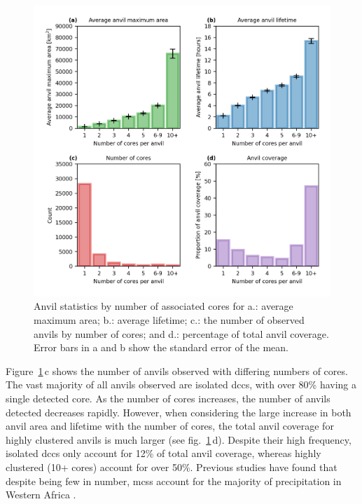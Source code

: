 \begin{figure}[tp]
    \includegraphics[width=\textwidth]{figures/chapter4_09.png}
    \caption[
    Anvil statistics by number of associated cores for average maximum area, average lifetime, occurrence of anvils by number of cores, and percentage of total anvil coverage
    ]{
    Anvil statistics by number of associated cores for a.: average maximum area; b.: average lifetime; c.: the number of observed anvils by number of cores; and d.: percentage of total anvil coverage. Error bars in a and b show the standard error of the mean.
    }
    \label{fig:seviri_anvil_stats}
\end{figure}


Figure~\ref{fig:seviri_anvil_stats}\,c shows the number of anvils observed with differing numbers of cores. 
The vast majority of all anvils observed are isolated \acrshort{dcc}s, with over 80\% having a single detected core. 
As the number of cores increases, the number of anvils detected decreases rapidly. 
However, when considering the large increase in both anvil area and lifetime with the number of cores, the total anvil coverage for highly clustered anvils is much larger (see fig.~\ref{fig:seviri_anvil_stats}\,d). 
Despite their high frequency, isolated \acrshort{dcc}s only account for 12\% of total anvil coverage, whereas highly clustered (10+ cores) account for over 50\%. 
Previous studies have found that despite being few in number, \acrshort{mcs}s account for the majority of precipitation in Western Africa \citep{vizy_understanding_2019}.

